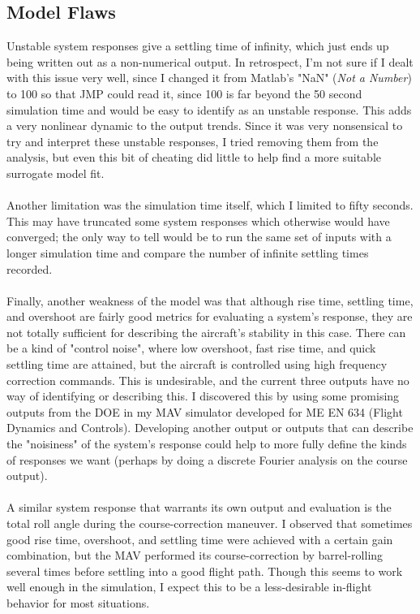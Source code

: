 \documentclass{article}
\begin{document}
\subsection{Model Flaws}
Unstable system responses give a settling time of infinity, which just ends up being written out as a non-numerical output. In retrospect, I'm not sure if I dealt with this issue very well, since I changed it from Matlab's "NaN" (\textit{Not a Number}) to 100 so that JMP could read it, since 100 is far beyond the 50 second simulation time and would be easy to identify as an unstable response. This adds a very nonlinear dynamic to the output trends. Since it was very nonsensical to try and interpret these unstable responses, I tried removing them from the analysis, but even this bit of cheating did little to help find a more suitable surrogate model fit.
\\\\Another limitation was the simulation time itself, which I limited to fifty seconds. This may have truncated some system responses which otherwise would have converged; the only way to tell would be to run the same set of inputs with a longer simulation time and compare the number of infinite settling times recorded.
\\\\Finally, another weakness of the model was that although rise time, settling time, and overshoot are fairly good metrics for evaluating a system's response, they are not totally sufficient for describing the aircraft's stability in this case. There can be a kind of "control noise", where low overshoot, fast rise time, and quick settling time are attained, but the aircraft is controlled using high frequency correction commands. This is undesirable, and the current three outputs have no way of identifying or describing this. I discovered this by using some promising outputs from the DOE in my MAV simulator developed for ME EN 634 (Flight Dynamics and Controls). Developing another output or outputs that can describe the "noisiness" of the system's response could help to more fully define the kinds of responses we want (perhaps by doing a discrete Fourier analysis on the course output).
\\\\A similar system response that warrants its own output and evaluation is the total roll angle during the course-correction maneuver. I observed that sometimes good rise time, overshoot, and settling time were achieved with a certain gain combination, but the MAV performed its course-correction by barrel-rolling several times before settling into a good flight path. Though this seems to work well enough in the simulation, I expect this to be a less-desirable in-flight behavior for most situations.
\end{document}
